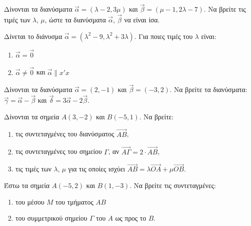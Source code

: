 \documentclass{presentation}
\begin{document}
\begin{askisi}
  Δίνονται τα διανύσματα $\vec{\alpha} = (\lambda - 2, 3\mu)$ και $\vec{\beta} = (\mu - 1, 2\lambda - 7)$.
  Να βρείτε τις τιμές των $\lambda$, $\mu$, ώστε τα διανύσματα $\vec{\alpha}$, $\vec{\beta}$ να είναι ίσα.
\end{askisi}

\begin{askisi}
  Δίνεται το διάνυσμα $\vec{\alpha} = (\lambda^{2} - 9, \lambda^{2} + 3\lambda)$. Για ποιες τιμές του $\lambda$ είναι:
  \begin{enumerate}
    \item $\vec{\alpha} = \vec{0}$
    \item $\vec{\alpha} \neq \vec{0}$ και $\vec{\alpha} \parallel x'x$
  \end{enumerate}
\end{askisi}

\begin{askisi}
  Δίνονται τα διανύσματα $\vec{\alpha} = (2, -1)$ και $\vec{\beta} = (-3, 2)$.
  Να βρείτε τα διανύσματα: $\vec{\gamma} = \vec{\alpha} - \vec{\beta}$ και $\vec{\delta} = 3\vec{\alpha} - 2\vec{\beta}$.
\end{askisi}

\begin{askisi}
  Δίνονται τα σημεία $A(3, -2)$ και $B(-5, 1)$. Να βρείτε:
  \begin{enumerate}
    \item τις συντεταγμένες του διανύσματος $\overrightarrow{AB}$,
    \item τις συντεταγμένες του σημείου $\Gamma$, αν $\overrightarrow{A\Gamma} = 2 \cdot \overrightarrow{AB}$,
    \item τις τιμές των $\lambda$, $\mu$ για τις οποίες ισχύει $\overrightarrow{AB} = \lambda \overrightarrow{OA} + \mu \overrightarrow{OB}$.
  \end{enumerate}
\end{askisi}

\begin{askisi}
  Έστω τα σημεία $A(-5, 2)$ και $B(1, -3)$. Να βρείτε τις συντεταγμένες:
  \begin{enumerate}
    \item του μέσου $M$ του τμήματος $AB$
    \item του συμμετρικού σημείου $Γ$ του $Α$ ως προς το $B$.
  \end{enumerate}
\end{askisi}

\end{document}
